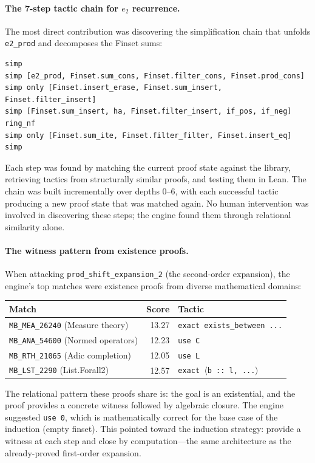 \documentclass[11pt]{article}
\theoremstyle{definition}
\theoremstyle{remark}
\begin{document}
\paragraph{The 7-step tactic chain for $e_2$ recurrence.}
The most direct contribution was discovering the simplification chain that unfolds \texttt{e2\_prod} and decomposes the Finset sums:
\begin{lstlisting}
simp
simp [e2_prod, Finset.sum_cons, Finset.filter_cons, Finset.prod_cons]
simp only [Finset.insert_erase, Finset.sum_insert, Finset.filter_insert]
simp [Finset.sum_insert, ha, Finset.filter_insert, if_pos, if_neg]
ring_nf
simp only [Finset.sum_ite, Finset.filter_filter, Finset.insert_eq]
simp
\end{lstlisting}
Each step was found by matching the current proof state against the library, retrieving tactics from structurally similar proofs, and testing them in Lean. The chain was built incrementally over depths 0--6, with each successful tactic producing a new proof state that was matched again. No human intervention was involved in discovering these steps; the engine found them through relational similarity alone.

\paragraph{The witness pattern from existence proofs.}
When attacking \texttt{prod\_shift\_expansion\_2} (the second-order expansion), the engine's top matches were existence proofs from diverse mathematical domains:
\begin{center}
\begin{tabular}{lrl}
\textbf{Match} & \textbf{Score} & \textbf{Tactic} \\
\hline
\texttt{MB\_MEA\_26240} (Measure theory) & 13.27 & \texttt{exact exists\_between ...} \\
\texttt{MB\_ANA\_54600} (Normed operators) & 12.23 & \texttt{use C} \\
\texttt{MB\_RTH\_21065} (Adic completion) & 12.05 & \texttt{use L} \\
\texttt{MB\_LST\_2290} (List.Forall2) & 12.57 & \texttt{exact \ensuremath{\langle}b :: l, ...\ensuremath{\rangle}} \\
\end{tabular}
\end{center}
The relational pattern these proofs share is: the goal is an existential, and the proof provides a concrete witness followed by algebraic closure. The engine suggested \texttt{use~0}, which is mathematically correct for the base case of the induction (empty finset). This pointed toward the induction strategy: provide a witness at each step and close by computation---the same architecture as the already-proved first-order expansion.
\end{document}
